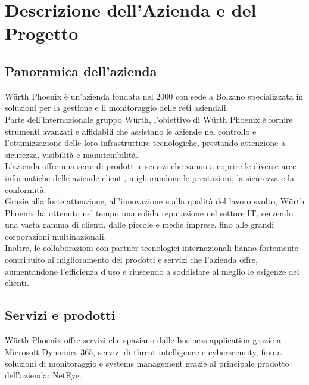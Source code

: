 \chapter{Descrizione dell'Azienda e del Progetto}
\label{cha:azienda_progetto}

\section{Panoramica dell'azienda}
\label{sec:panoramica} Würth Phoenix è un'azienda fondata nel 2000 con sede a
Bolzano specializzata in soluzioni per la gestione e il monitoraggio delle reti
aziendali.\\ Parte dell'internazionale gruppo Würth, l'obiettivo di Würth Phoenix
è fornire strumenti avanzati e affidabili che assistano le aziende nel controllo
e l'ottimizzazione delle loro infrastrutture tecnologiche, prestando attenzione
a sicurezza, visibilità e manutenibilità.\\ L'azienda offre una serie di prodotti
e servizi che vanno a coprire le diverse aree informatiche delle aziende clienti,
migliorandone le prestazioni, la sicurezza e la conformità.\\ Grazie alla forte attenzione,
all'innovazione e alla qualità del lavoro svolto, Würth Phoenix ha ottenuto nel tempo
una solida reputazione nel settore IT, servendo una vasta gamma di clienti, dalle
piccole e medie imprese, fino alle grandi corporazioni multinazionali.\\ Inoltre,
le collaborazioni con partner tecnologici internazionali hanno fortemente contribuito
al miglioramento dei prodotti e servizi che l'azienda offre, aumentandone l'efficienza
d'uso e riuscendo a soddisfare al meglio le esigenze dei clienti.

\section{Servizi e prodotti}
\label{sec:servizi_prodotti} Würth Phoenix offre servizi che spaziano dalle
business application grazie a Microsoft Dynamics 365, servizi di threat intelligence
e cybersecurity, fino a soluzioni di monitoraggio e systems management grazie al
principale prodotto dell'azienda: NetEye.\\

